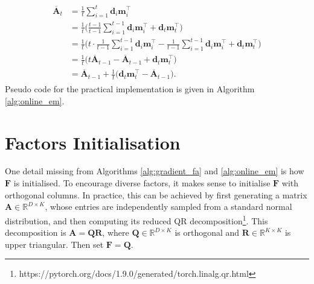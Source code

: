 \documentclass[msc,deptreport.inf]{infthesis} %
\newcommand{\matr}[1]{\mathbf{#1}}
\newcommand{\R}{\mathbb R}
\begin{document}
\begin{align}
\begin{split}
	\overline{\matr{A}}_t 
	& = \frac{1}{t} \sum_{i=1}^t \matr{d}_i \matr{m}_i^\intercal \\
	& = \frac{1}{t}\Bigg(\frac{t-1}{t-1} \sum_{i=1}^{t-1} \matr{d}_i \matr{m}_i^\intercal + \matr{d}_t \matr{m}_t^\intercal \Bigg) \\
	& = \frac{1}{t}\Bigg(t \cdot \frac{1}{t-1} \sum_{i=1}^{t-1} \matr{d}_i \matr{m}_i^\intercal - \frac{1}{t-1} \sum_{i=1}^{t-1} \matr{d}_i \matr{m}_i^\intercal + \matr{d}_t \matr{m}_t^\intercal \Bigg) \\
	& = \frac{1}{t}\Big(t \overline{\matr{A}}_{t-1} - \overline{\matr{A}}_{t-1} + \matr{d}_t \matr{m}_t^\intercal \Big) \\
	& = \overline{\matr{A}}_{t-1} + \frac{1}{t} \big(\matr{d}_t \matr{m}_t^\intercal - \overline{\matr{A}}_{t-1} \big).
\end{split}
\end{align}
Pseudo code for the practical implementation is given in Algorithm \ref{alg:online_em}.

\section{Factors Initialisation}\label{sec:F_init}

One detail missing from Algorithms \ref{alg:gradient_fa} and \ref{alg:online_em} is how $\matr{F}$ is initialised. To encourage diverse factors, it makes sense to initialise $\matr{F}$ with orthogonal columns. In practice, this can be achieved by first generating a matrix $\matr{A}  \in \R^{D \times K}$, whose entries are independently sampled from a standard normal distribution, and then computing its reduced QR decomposition\footnote{https://pytorch.org/docs/1.9.0/generated/torch.linalg.qr.html}. This decomposition is $\matr{A} = \matr{Q}\matr{R}$, where $\matr{Q} \in \R^{D \times K}$ is orthogonal and $\matr{R} \in \R^{K \times K}$ is upper triangular. Then set $\matr{F} = \matr{Q}$. 
\end{document}
